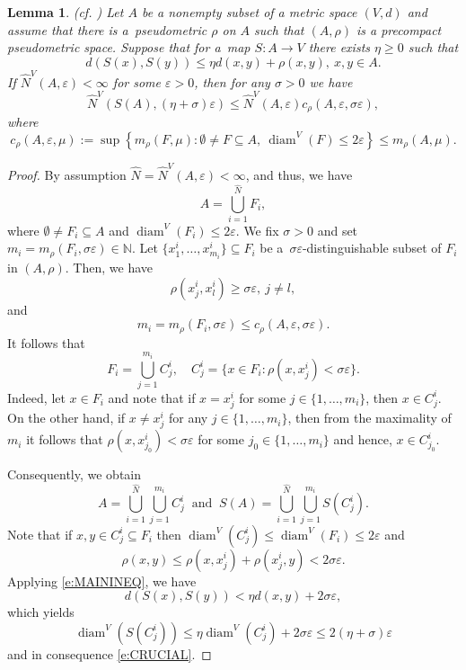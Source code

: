 \documentclass[a4paper,12pt,reqno]{amsart}
\theoremstyle{plain}
\newtheorem{lem}{Lemma}[section]
\theoremstyle{definition}
\numberwithin{equation}{section}
\newcommand{\N}{\mathbb{N}}
\newcommand{\eps}{\varepsilon}
\newcommand{\diam}{\operatorname{diam}}
\renewcommand{\geq}{\geqslant}
\renewcommand{\leq}{\leqslant}
\begin{document}
\begin{lem}(cf. \cite[p.~25]{cl2008}) \label{lem:FUNDAMENTAL}
Let $A$ be a nonempty subset of a metric space $(V,d)$ and assume that there is
a~pseudometric $\rho$ on $A$ such that $(A,\rho)$ is a precompact pseudometric space.
Suppose that for a~map $S\colon A\to V$ there exists $\eta\geq 0$ such that
\begin{equation}\label{e:MAININEQ}
d(S(x),S(y))\leq\eta d(x,y)+\rho(x,y),\ x,y\in A.
\end{equation}
If $\widehat{N}^{V}(A,\eps)<\infty$ 
for some $\eps>0$, then for any $\sigma>0$ we have
\begin{equation}\label{e:CRUCIAL}
\widehat{N}^{V}(S(A),(\eta+\sigma)\eps)\leq \widehat{N}^{V}(A,\eps)c_\rho(A,\eps,\sigma\eps),
\end{equation}
where
\begin{equation}\label{e:DEFCRHO}
c_\rho(A,\eps,\mu):=\sup\left\{m_{\rho}(F,\mu)\colon\emptyset\neq F\subseteq A,\ \diam^{V}(F)\leq 2\eps\right\}\leq {m_{\rho}(A,\mu)}.
\end{equation}
\end{lem}

\begin{proof}
By assumption 
$\widehat{N}=\widehat{N}^{V}(A,\eps)<\infty$, and thus, we have
$$A=\bigcup_{i=1}^{\widehat{N}}F_i,$$
where $\emptyset\neq F_i\subseteq A$ and $\diam^{V}(F_i)\leq 2\eps$.
We fix $\sigma>0$ and set $m_i=m_{\rho}(F_i,\sigma\eps)\in\N$.
Let $\{x_1^{i},\ldots,x_{m_i}^{i}\}\subseteq F_i$ be a~$\sigma\eps$-distinguishable subset of $F_i$ in $(A,\rho)$. Then,  we have
$$\rho(x_j^{i},x_{l}^{i})\geq\sigma\eps,\ j\neq l,$$
and
$$m_i=m_{\rho}(F_i,\sigma\eps)\leq c_\rho(A,\eps,\sigma\eps).$$
It follows that
$$F_i=\bigcup_{j=1}^{m_i}C_j^{i},\quad C_j^{i}=\{x\in F_i\colon\rho(x,x_j^{i})<\sigma\eps\}.$$
Indeed, let $x\in F_i$ and note that if $x=x_j^{i}$ for some $j\in\{1,\ldots,m_i\}$, then
$x\in C_j^{i}$. On the other hand, if $x\neq x_j^{i}$ for any $j\in\{1,\ldots, m_i\}$, then from the maximality of $m_i$
it follows that $\rho(x,x_{j_0}^{i})<\sigma\eps$ for some $j_0\in\{1,\ldots, m_i\}$ and hence, $x\in C_{j_0}^{i}$.

Consequently, we obtain
$$A=\bigcup_{i=1}^{\widehat{N}}\bigcup_{j=1}^{m_i}C_j^{i}\ \mbox{ and }\ S(A)=\bigcup_{i=1}^{\widehat{N}}\bigcup_{j=1}^{m_i}S(C_j^{i}).$$
Note that if $x,y\in C_j^{i}\subseteq F_i$ then $\diam^{V}(C_j^{i})\leq\diam^{V}(F_i)\leq 2\eps$
and
$$\rho(x,y)\leq\rho(x,x_j^{i})+\rho(x_j^{i},y)<2\sigma\eps.$$
Applying \eqref{e:MAININEQ}, we have
$$d(S(x),S(y))<\eta d(x,y)+2\sigma\eps,$$
which yields
$$\diam^{V}(S(C_j^{i}))\leq\eta\diam^{V}(C_j^{i})+2\sigma\eps\leq2(\eta+\sigma)\eps$$
and in consequence \eqref{e:CRUCIAL}.
\end{proof}
\end{document}
